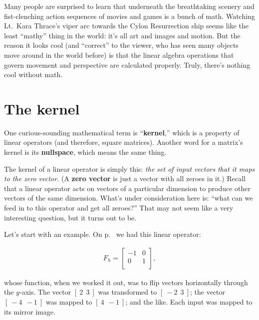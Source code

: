 
Many people are surprised to learn that underneath the breathtaking scenery and
fist-clenching action sequences of movies and games is a bunch of math.
Watching Lt.~Kara Thrace's viper arc towards the Cylon Resurrection ship seems
like the least ``mathy'' thing in the world: it's all art and images and
motion. But the reason it looks cool (and ``correct'' to the viewer, who has
seen many objects move around in the world before) is that the linear algebra
operations that govern movement and perspective are calculated properly. Truly,
there's nothing cool without math.



\section{The kernel}


One curious-sounding mathematical term is ``\textbf{kernel},'' which is a
property of linear operators (and therefore, square matrices). Another word for
a matrix's kernel is its \textbf{nullspace}, which means the same thing.


The kernel of a linear operator is simply this: \textit{the set of input
vectors that it maps to the zero vector.} (A \textbf{zero vector} is just a
vector with all zeroes in it.) Recall that a linear operator acts on vectors of
a particular dimension to produce other vectors of the same dimension. What's
under consideration here is: ``what can we feed in to this operator and get all
zeroes?'' That may not seem like a very interesting question, but it turns out
to be.

Let's start with an example. On p.~\pageref{flipOperator} we had this linear
operator:

\vspace{-.15in}
\begin{align*}
F_{h} =
\begin{bmatrix}
-1 & 0 \\
0 & 1 \\
\end{bmatrix},
\end{align*}
\vspace{-.15in}

whose function, when we worked it out, was to flip vectors horizontally through
the $y$-axis. The vector $[\ 2\ \ 3\ ]$ was transformed to $[\ -2\ \ 3\ ]$; the
vector $[\ -4\ \ -1\ ]$ was mapped to $[\ 4\ \ -1\ ]$; and the like. Each input
was mapped to its mirror image.

